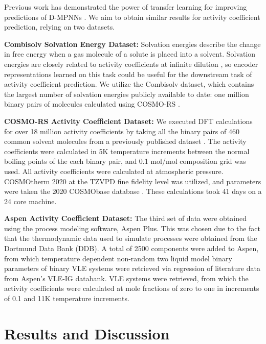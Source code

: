 Previous work has demonstrated the power of transfer learning for improving predictions of D-MPNNs \cite{Vermeire2021}. We aim to obtain similar results for activity coefficient prediction, relying on two datasets.

\noindent
\textbf{Combisolv Solvation Energy Dataset:} Solvation energies describe the change in free energy when a gas molecule of a solute is placed into a solvent. Solvation energies are closely related to activity coefficients at infinite dilution \cite{Moine2017}, so encoder representations learned on this task could be useful for the downstream task of activity coefficient prediction. We utilize the Combisolv dataset, which contains the largest number of solvation energies publicly available to date: one million binary pairs of molecules calculated using COSMO-RS \cite{Vermeire2021}.

\noindent
\textbf{COSMO-RS Activity Coefficient Dataset:} We executed DFT calculations for over 18 million activity coefficients by taking all the binary pairs of 460 common solvent molecules from a previously published dataset \cite{Amar2019}. The activity coefficients were calculated in 5K temperature increments between the normal boiling points of the each binary pair, and 0.1 mol/mol composition grid was used. All activity coefficients were calculated at atmospheric pressure. COSMOtherm 2020 at the TZVPD fine fidelity level was utilized, and parameters were taken the 2020 COSMObase database \cite{Klamt2010}. These calculations took 41 days on a 24 core machine. 

\noindent
\textbf{Aspen Activity Coefficient Dataset:} The third set of data were obtained using the process modeling software, Aspen Plus. This was chosen due to the fact that the thermodynamic data used to simulate processes were obtained from the Dortmund Data Bank (DDB). A total of 2500 components were added to Aspen, from which temperature dependent non-random two liquid model binary parameters of binary VLE systems were retrieved via regression of literature data from Aspen’s VLE-IG databank. VLE systems were retrieved, from which the activity coefficients were calculated at mole fractions of zero to one in increments of 0.1 and 11K temperature increments. 



\section{Results and Discussion}

